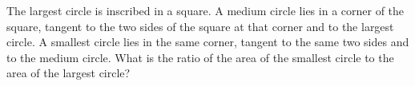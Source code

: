 The largest circle is inscribed in a square. A medium circle lies in a corner of the square, tangent to the two sides of the square at that corner and to the largest circle. A smallest circle lies in the same corner, tangent to the same two sides and to the medium circle. What is the ratio of the area of the smallest circle to the area of the largest circle?
